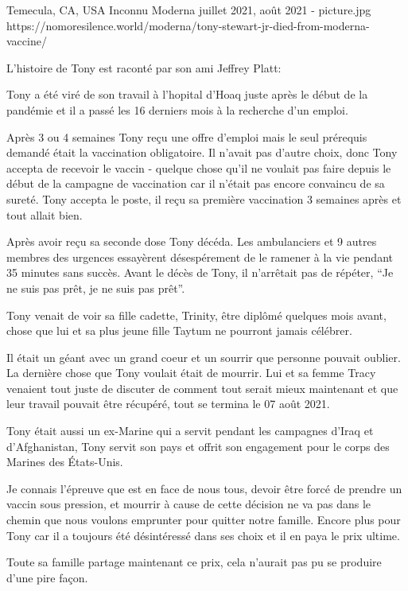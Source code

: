 {Temecula, CA, USA}
{Inconnu}
{Moderna}
{juillet 2021, août 2021}
{-}
{picture.jpg}
{https://nomoresilence.world/moderna/tony-stewart-jr-died-from-moderna-vaccine/}
{

L'histoire de Tony est raconté par son ami Jeffrey Platt:

Tony a été viré de son travail à l'hopital d'Hoaq juste après le début de la pandémie et il a passé les 16 derniers mois à la recherche d'un emploi.

Après 3 ou 4 semaines Tony reçu une offre d'emploi mais le seul prérequis demandé était la vaccination obligatoire. Il n'avait pas d'autre choix, donc Tony accepta de recevoir le vaccin - quelque chose qu'il ne voulait pas faire depuis le début de la campagne de vaccination car il n'était pas encore convaincu de sa sureté. Tony accepta le poste, il reçu sa première vaccination 3 semaines après et tout allait bien.

Après avoir reçu sa seconde dose Tony décéda. Les ambulanciers et 9 autres membres des urgences essayèrent désespérement de le ramener à la vie pendant 35 minutes sans succès. Avant le décès de Tony, il n'arrêtait pas de répéter, “Je ne suis pas prêt, je ne suis pas prêt”.

Tony venait de voir sa fille cadette, Trinity, être diplômé quelques mois avant, chose que lui et sa plus jeune fille Taytum ne pourront jamais célébrer.

Il était un géant avec un grand coeur et un sourrir que personne pouvait oublier. La dernière chose que Tony voulait était de mourrir. Lui et sa femme Tracy venaient tout juste de discuter de comment tout serait mieux maintenant et que leur travail pouvait être récupéré, tout se termina le 07 août 2021.

Tony était aussi un ex-Marine qui a servit pendant les campagnes d'Iraq et d'Afghanistan, Tony servit son pays et offrit son engagement pour le corps des Marines des États-Unis.

Je connais l'épreuve que est en face de nous tous, devoir être forcé de prendre un vaccin sous pression, et mourrir à cause de cette décision ne va pas dans le chemin que nous voulons emprunter pour quitter notre famille. Encore plus pour Tony car il a toujours été désintéressé dans ses choix et il en paya le prix ultime.

Toute sa famille partage maintenant ce prix, cela n'aurait pas pu se produire d'une pire façon.

}
